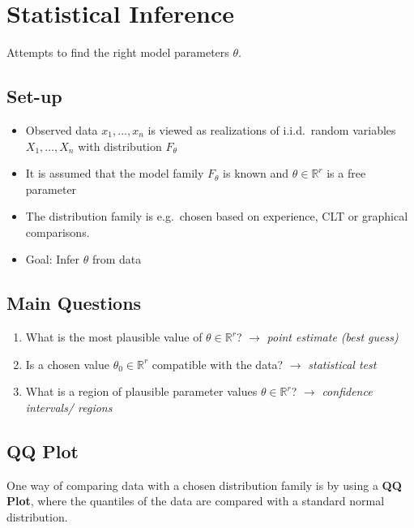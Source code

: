 \section{Statistical Inference}
Attempts to find the right model parameters $\theta$.
\subsection{Set-up}
\begin{itemize}
    \item Observed data $x_1,\ldots, x_n$ is viewed as realizations of i.i.d.\ random variables $X_1,\ldots, X_n$ with distribution $F_\theta$
    \item It is assumed that the model family $F_\theta$ is known and $\theta\in \mathbb{R}^r$ is a free parameter
    \item The distribution family is e.g.\ chosen based on experience, CLT or graphical comparisons.
    \item Goal: Infer $\theta$ from data
\end{itemize}

\subsection{Main Questions}
\begin{enumerate}
    \item What is the most plausible value of  $\theta\in \mathbb{R}^r$?\newline
          $\to$ \textit{point estimate (best guess)}
    \item Is a chosen value  $\theta_0\in \mathbb{R}^r$ compatible with the data?\newline
          $\to$ \textit{statistical test}
    \item What is a region of plausible parameter values  $\theta\in \mathbb{R}^r$?\newline
          $\to$ \textit{confidence intervals/ regions}
\end{enumerate}

\subsection{QQ Plot}
One way of comparing data with a chosen distribution family is by using a \textbf{QQ Plot},
where the quantiles of the data are compared with a standard normal distribution.


